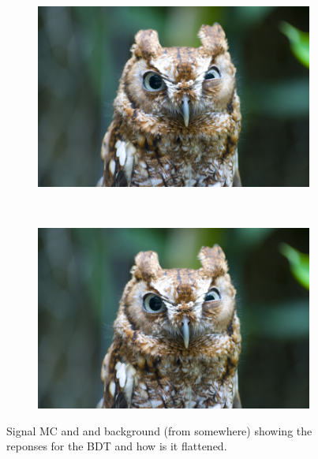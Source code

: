 \begin{figure}
    \centering
    \begin{subfigure}[b]{0.5\textwidth}
        \includegraphics[width=\textwidth]{./Figs/placeholder.jpeg}
        \caption{ }
        \label{fig:BDTsig}
    \end{subfigure}
    ~ %
    \begin{subfigure}[b]{0.5\textwidth}
       \includegraphics[width=\textwidth]{./Figs/placeholder.jpeg}
        \caption{ }
        \label{fig:BDTbkg}
    \end{subfigure}
    \caption{Signal MC and and background (from somewhere) showing the reponses for the BDT and how is it flattened.}
    \label{fig:FlatteningBDT}
\end{figure}


